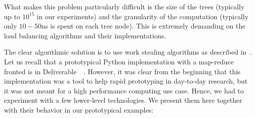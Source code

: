 \documentclass{deliverablereport}
\begin{document}
What makes this problem particularly difficult is the size of the
trees (typically up to $10^{15}$ in our experiments) and the granularity of the
computation (typically only $10-50$ns is spent on each tree node). This is
extremely demanding on the load balancing algorithms and their implementations.

The clear algorithmic solution is to use work stealing algorithms as
described in~\cite{10.1109/SFCS.1994.365680, BlumofeL99}. Let us recall
that a prototypical Python implementation with a map-reduce fronted
is in Deliverable~~\cite{map-reduce}. However, it
was clear from the beginning that this 
implementation was a tool to help rapid prototyping in day-to-day research,
but it was not meant for a high performance computing use case. Hence, we had
to experiment with a few lower-level technologies. We present them here together with their
behavior in our prototypical examples:
\end{document}
